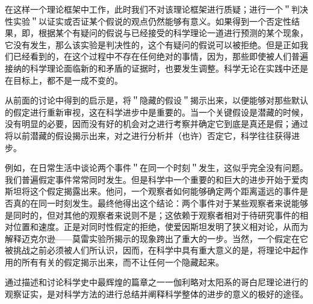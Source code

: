 在这样一个理论框架中工作，此时我们不对该理论框架进行质疑；进行一个＂判决性实验＂以证实或否证某个假说的观点仍然能够有意义。如果得到一个否定性结果，即，根据某个有疑问的假说与已经接受的科学理论一道进行预测的某个现象，它没有发生，那么该实验是判决性的，这个有疑问的假说可以被拒绝。但是正如我们已经看到的，在这个过程中不存在任何绝对的事情，因为，那些即使被人们普遍接纳的科学理论面临新的和矛盾的证据时，也要发生调整。科学无论在实践中还是在目标上，都不是一成不变的。

从前面的讨论中得到的启示是，将＂隐藏的假设＂揭示出来，以便能够对那些默认的假定进行重新审视，这在科学进步中是重要的。当一个关键假设是潜藏的时候，没有明显的必要，因而没有好的机会对之进行考察并确定它到底是真还是假；通过将以前潜藏的假设揭示出来，对之进行分析并（也许）否定它，科学往往获得进步。

例如，在日常生活中谈论两个事件＂在同一个时刻＂发生，这似乎完全没有问题。我们普遍假定事件常常同时发生。但是科学中一个重要的和巨大的进步开始于爱肉斯坦将这个假定揭露出来。他问，一个观察者如何能够确定两个距离遥远的事件是否真的在同一时刻发生。最终他得出这个结论：两个事件对于某些观察者来说能够是同时的，但对其他的观察者来说则不是；这依赖于观察者相对于待研究事件的相对位置和速度。正是对同时性假定的拒绝，使爱因斯坦发明了狭义相对论，从而为解释迈克尔逊——莫雷实验所揭示的现象跨出了重大的一步。当然，一个假定在它被挑战之前必须被人们所认识，因而，在科学中具有重大意义的是，将理论中起作用的所有有关的假定揭示出来，而不让任何一个隐藏起来。

通过描述和讨论科学史中最辉煌的篇章之一一伽利略对太阳系的哥白尼理论进行的观察证实，是对科学方法的进行总结并阐释科学整体的进步的意义的极好的途径。 

